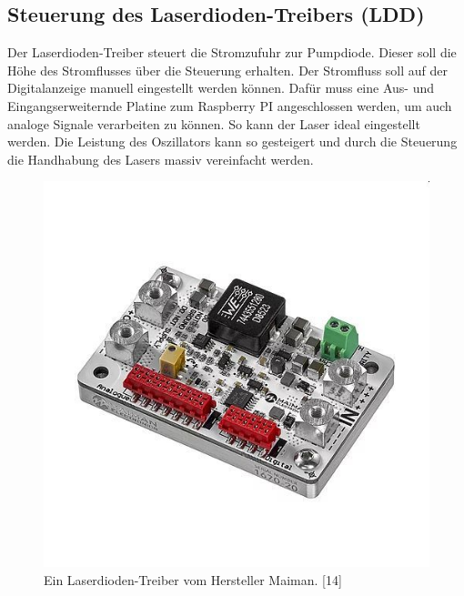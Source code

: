 \subsection{Steuerung des Laserdioden-Treibers (LDD)}
Der Laserdioden-Treiber steuert die Stromzufuhr zur Pumpdiode. Dieser soll die Höhe des Stromflusses über die Steuerung erhalten. Der Stromfluss soll auf der Digitalanzeige manuell eingestellt werden können. Dafür muss eine Aus- und Eingangserweiternde Platine zum Raspberry PI angeschlossen werden, um auch analoge Signale verarbeiten zu können.
So kann der Laser ideal eingestellt werden. Die Leistung des Oszillators kann so gesteigert und durch die Steuerung die Handhabung des Lasers massiv vereinfacht werden.  %

\begin{figure}[H]
    \centering
    \includegraphics[scale=0.4, trim={0 30mm 0 40mm},clip]{98_images/ldd_maiman.jpg}
    \caption{Ein Laserdioden-Treiber vom Hersteller Maiman. [14]}
    \label{fig:ldd}
\end{figure}

